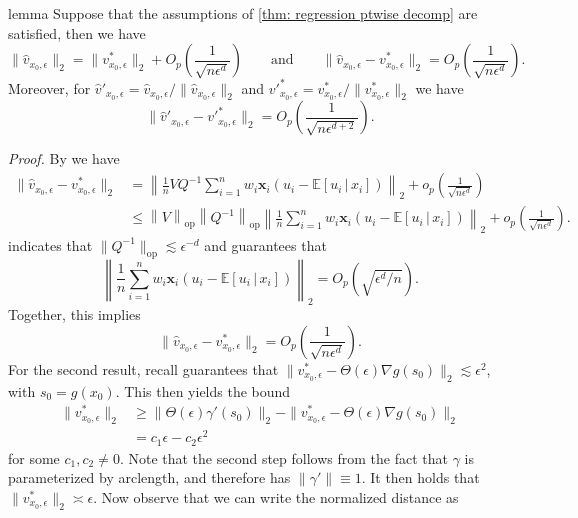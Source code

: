 \documentclass[11pt]{article}
\begin{document}
\begin{appendices}
\begin{restatable}{lemma}{} \label{lemma: scaled high prob bound for velocity}
    Suppose that the assumptions of \cref{thm: regression ptwise decomp} are satisfied, then we have 
    \[\|\hat{v}_{x_0, \epsilon}\|_2  = \|v^*_{x_0, \epsilon}\|_2 + O_p\left(\frac{1}{\sqrt{n\epsilon^d}}\right) \qquad \text{and} \qquad \|\hat{v}_{x_0, \epsilon} - v^*_{x_0, \epsilon}\|_2 = O_p\left(\frac{1}{\sqrt{n\epsilon^d}}\right).\]
    Moreover, for $\hat{v}'_{x_0, \epsilon} = \hat{v}_{x_0, \epsilon}/\|\hat{v}_{x_0, \epsilon}\|_2$ and $v'^*_{x_0, \epsilon} = v^*_{x_0, \epsilon}/\|v^*_{x_0, \epsilon}\|_2$ we have
    \[\|\hat{v}'_{x_0, \epsilon} - v'^*_{x_0, \epsilon}\|_2 = O_p\left(\frac{1}{\sqrt{n\epsilon^{d+2}}}\right).\]
\end{restatable}
\noindent \textit{Proof.} By  we have
\begin{align*}
\|\hat{v}_{x_0, \epsilon} - v^*_{x_0, \epsilon}\|_2 &= \left\|\frac{1}{n}VQ^{-1}\sum_{i = 1}^nw_i\boldsymbol{x}_i(u_i - \mathbb{E}[u_i \,|\, x_i])\right\|_2 +o_p\left(\frac{1}{\sqrt{n\epsilon^{d}}}\right) \\
&\leq \left\|V\right\|_{\operatorname{op}}\left\|Q^{-1}\right\|_{\operatorname{op}}\left\|\frac{1}{n}\sum_{i = 1}^nw_i\boldsymbol{x}_i(u_i - \mathbb{E}[u_i \,|\, x_i])\right\|_2+o_p\left(\frac{1}{\sqrt{n\epsilon^{d}}}\right).
\end{align*}
 indicates that $\|Q^{-1}\|_{\operatorname{op}}\lesssim \epsilon^{-d}$ and  guarantees that \[\left\|\frac{1}{n}\sum_{i = 1}^nw_i\boldsymbol{x}_i(u_i - \mathbb{E}[u_i \,|\, x_i])\right\|_2 = O_p\left(\sqrt{\epsilon^d/n}\right).\] Together, this implies
\[\|\hat{v}_{x_0, \epsilon} - v^*_{x_0, \epsilon}\|_2 = O_p\left(\frac{1}{\sqrt{n\epsilon^d}}\right).\]
For the second result, recall  guarantees that $\|v^*_{x_0, \epsilon} - \Theta(\epsilon)\nabla g(s_0)\|_2 \lesssim \epsilon^2$, with $s_0 = g(x_0)$. This then yields the bound
\begin{align*}
    \|v^*_{x_0, \epsilon}\|_2 &\geq \|\Theta(\epsilon)\gamma'(s_0)\|_2 - \|v^*_{x_0, \epsilon} - \Theta(\epsilon)\nabla g(s_0)\|_2 \\
    &= c_1\epsilon - c_2\epsilon^2
\end{align*}
for some $c_1, c_2 \neq 0$. Note that the second step follows from the fact that $\gamma$ is parameterized by arclength, and therefore has $\|\gamma'\| \equiv 1$. It then holds that $\|v^*_{x_0, \epsilon}\|_2 \asymp \epsilon$. Now observe that we can write the normalized distance as 

\end{appendices}
\end{document}
